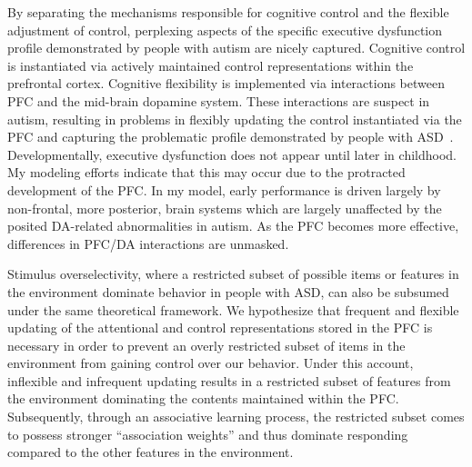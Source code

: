 \documentclass[man]{apa}
\begin{document}
By separating the mechanisms responsible for cognitive control and the flexible adjustment of control, perplexing aspects of the specific executive dysfunction profile demonstrated by people with autism are nicely captured.  Cognitive control is instantiated via actively maintained control representations within the prefrontal cortex.  Cognitive flexibility is implemented via interactions between PFC and the mid-brain dopamine system.  These interactions are suspect in autism, resulting in problems in flexibly updating the control instantiated via the PFC and capturing the problematic profile demonstrated by people with ASD~\cite{HillEL:2004:AutismExecutiveDysfunction,Ozonoff:1991:AutismExecutiveDysfunction}.  Developmentally, executive dysfunction does not appear until later in childhood.  My modeling efforts indicate that this may occur due to the protracted development of the PFC.  In my model, early performance is driven largely by non-frontal, more posterior, brain systems which are largely unaffected by the posited DA-related abnormalities in autism.  As the PFC becomes more effective, differences in PFC/DA interactions are unmasked.  

Stimulus overselectivity, where a restricted subset of possible items or features in the environment dominate behavior in people with ASD, can also be subsumed under the same theoretical framework.  We hypothesize that frequent and flexible updating of the attentional and control representations stored in the PFC is necessary in order to prevent an overly restricted subset of items in the environment from gaining control over our behavior.  Under this account, inflexible and infrequent updating results in a restricted subset of features from the environment dominating the contents maintained within the PFC.  Subsequently, through an associative learning process, the restricted subset comes to possess stronger ``association weights'' and thus dominate responding compared to the other features in the environment.
\end{document}
